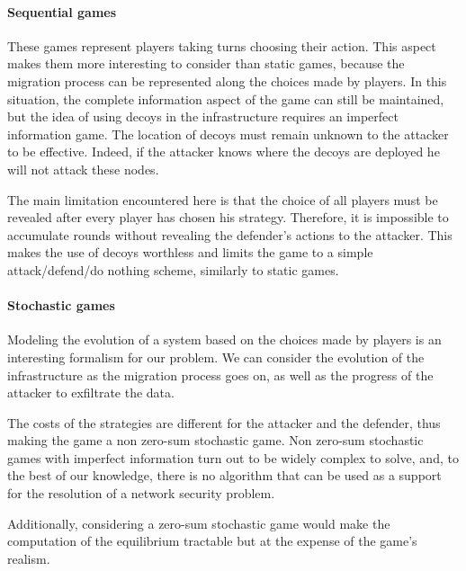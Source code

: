 
\paragraph{Sequential games} These games represent players taking turns choosing their action. This aspect makes them more interesting to consider than static games, because the migration process can be represented along the choices made by players. In this situation, the complete information aspect of the game can still be maintained, but the idea of using decoys in the infrastructure requires an imperfect information game. The location of decoys must remain unknown to the attacker to be effective.
Indeed, if the attacker knows where the decoys are deployed he will not attack these nodes.

The main limitation encountered here is that the choice of all players must be revealed after every player has chosen his strategy. Therefore, it is impossible to accumulate rounds without revealing the defender's actions to the attacker. This makes the use of decoys worthless and limits the game to a simple attack/defend/do nothing scheme, similarly to static games.

\paragraph{Stochastic games} Modeling the evolution of a system based on the choices made by players is an interesting formalism for our problem. We can consider the evolution of the infrastructure as the migration process goes on, as well as the progress of the attacker to exfiltrate the data. 

The costs of the strategies are different for the attacker and the defender, thus making the game a non zero-sum stochastic game. Non zero-sum stochastic games with imperfect information turn out to be widely complex to solve, and, to the best of our knowledge, there is no algorithm that can be used as a support for the resolution of a network security problem. 

Additionally, considering a zero-sum stochastic game would make the computation of the equilibrium tractable but at the expense of the game's realism.


